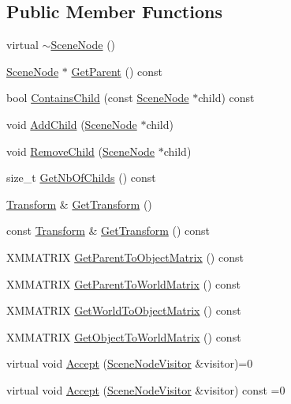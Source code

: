\subsection*{Public Member Functions}
\begin{DoxyCompactItemize}
\item 
virtual \hyperlink{classmage_1_1_scene_node_ad7ae54e25fb970772c0b0a6c5bac57ff}{$\sim$\+Scene\+Node} ()
\item 
\hyperlink{classmage_1_1_scene_node}{Scene\+Node} $\ast$ \hyperlink{classmage_1_1_scene_node_a512a9d0f935abf304980312680be3f30}{Get\+Parent} () const
\item 
bool \hyperlink{classmage_1_1_scene_node_a99c86a1d18b41d4c5ce0384ba53a0952}{Contains\+Child} (const \hyperlink{classmage_1_1_scene_node}{Scene\+Node} $\ast$child) const
\item 
void \hyperlink{classmage_1_1_scene_node_ac07f89af783b1658a1f74205914f6fa3}{Add\+Child} (\hyperlink{classmage_1_1_scene_node}{Scene\+Node} $\ast$child)
\item 
void \hyperlink{classmage_1_1_scene_node_a42aa6487f21c948ab7ce6f64a57e5f11}{Remove\+Child} (\hyperlink{classmage_1_1_scene_node}{Scene\+Node} $\ast$child)
\item 
size\+\_\+t \hyperlink{classmage_1_1_scene_node_a99c5eb3c253a2e620bd85ac845d3bb77}{Get\+Nb\+Of\+Childs} () const
\item 
\hyperlink{structmage_1_1_transform}{Transform} \& \hyperlink{classmage_1_1_scene_node_a72bfe51e9f233dd35fd8affd24b0a67a}{Get\+Transform} ()
\item 
const \hyperlink{structmage_1_1_transform}{Transform} \& \hyperlink{classmage_1_1_scene_node_ab68ffa4886e8e5ff9757362823a1aa74}{Get\+Transform} () const
\item 
X\+M\+M\+A\+T\+R\+IX \hyperlink{classmage_1_1_scene_node_a5ec8b0d2e5ba7873842c0fa65e1248bb}{Get\+Parent\+To\+Object\+Matrix} () const
\item 
X\+M\+M\+A\+T\+R\+IX \hyperlink{classmage_1_1_scene_node_afb199589e809c3cb0e46a691a737e5da}{Get\+Parent\+To\+World\+Matrix} () const
\item 
X\+M\+M\+A\+T\+R\+IX \hyperlink{classmage_1_1_scene_node_a0ddba0d70a8b2ce0ef80f25673d0dd56}{Get\+World\+To\+Object\+Matrix} () const
\item 
X\+M\+M\+A\+T\+R\+IX \hyperlink{classmage_1_1_scene_node_a4325660d42f5f393c77389a44aedb5cb}{Get\+Object\+To\+World\+Matrix} () const
\item 
virtual void \hyperlink{classmage_1_1_scene_node_a32ed8763c8f8b4caa155f64551d96f13}{Accept} (\hyperlink{classmage_1_1_scene_node_visitor}{Scene\+Node\+Visitor} \&visitor)=0
\item 
virtual void \hyperlink{classmage_1_1_scene_node_a35fbfd49185fb61cb4e9edf56af35262}{Accept} (\hyperlink{classmage_1_1_scene_node_visitor}{Scene\+Node\+Visitor} \&visitor) const =0
\end{DoxyCompactItemize}
